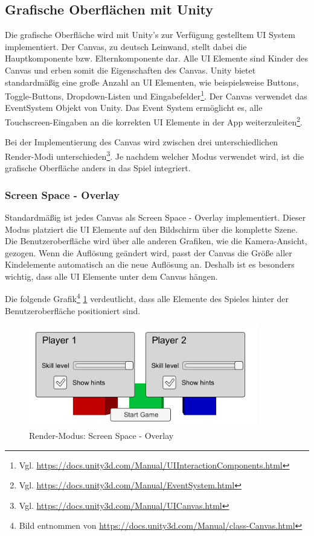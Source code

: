	\subsection{Grafische Oberflächen mit Unity}
		Die grafische Oberfläche wird mit Unity's zur Verfügung gestelltem UI System implementiert. Der Canvas, zu deutsch Leinwand, stellt dabei die Hauptkomponente bzw. Elternkomponente dar. Alle UI Elemente sind Kinder des Canvas und erben somit die Eigenschaften des Canvas. Unity bietet standardmäßig eine große Anzahl an UI Elementen, wie beispielsweise Buttons, Toggle-Buttons, Dropdown-Listen und Eingabefelder\footnote{Vgl. \url{https://docs.unity3d.com/Manual/UIInteractionComponents.html}}. Der Canvas verwendet das EventSystem Objekt von Unity. Das Event System ermöglicht es, alle Touchscreen-Eingaben an die korrekten UI Elemente in der App weiterzuleiten\footnote{Vgl. \url{https://docs.unity3d.com/Manual/EventSystem.html}}.

		Bei der Implementierung des Canvas wird zwischen drei unterschiedlichen Render-Modi unterschieden\footnote{Vgl. \url{https://docs.unity3d.com/Manual/UICanvas.html}}. Je nachdem welcher Modus verwendet wird, ist die grafische Oberfläche anders in das Spiel integriert.

		\subsubsection{Screen Space - Overlay}
			Standardmäßig ist jedes Canvas als Screen Space - Overlay implementiert. Dieser Modus platziert die UI Elemente auf den Bildschirm über die komplette Szene. Die Benutzeroberfläche wird über alle anderen Grafiken, wie die Kamera-Ansicht, gezogen. Wenn die Auflösung geändert wird, passt der Canvas die Größe aller Kindelemente automatisch an die neue Auflösung an. Deshalb ist es besonders wichtig, dass alle UI Elemente unter dem Canvas hängen. 

			Die folgende Grafik\footnote{Bild entnommen von \url{https://docs.unity3d.com/Manual/class-Canvas.html}} \ref{renderOverlay} verdeutlicht, dass alle Elemente des Spieles hinter der Benutzeroberfläche positioniert sind.

			\begin{figure}[htbp]
				\centering 
				\label{renderOverlay}
				\includegraphics[width=10cm]{pics/CanvasOverlay.png}
				\caption{Render-Modus: Screen Space - Overlay}
			\end{figure}

